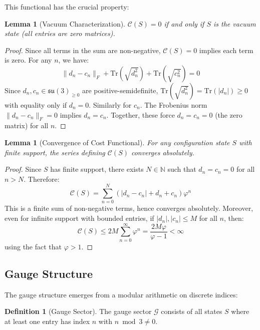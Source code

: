 \documentclass[11pt]{article}
\numberwithin{equation}{section}
\newtheorem{lemma}[theorem]{Lemma}
\theoremstyle{definition}
\newtheorem{definition}[theorem]{Definition}
\theoremstyle{remark}
\begin{document}
This functional has the crucial property:

\begin{lemma}[Vacuum Characterization]
\label{lem:vacuum}
$\mathcal{C}(S) = 0$ if and only if $S$ is the vacuum state (all entries are zero matrices).
\end{lemma}

\begin{proof}
Since all terms in the sum are non-negative, $\mathcal{C}(S) = 0$ implies each term is zero. For any $n$, we have:
\[\|d_n - c_n\|_F + \text{Tr}(\sqrt{d_n^2}) + \text{Tr}(\sqrt{c_n^2}) = 0\]
Since $d_n, c_n \in \mathfrak{su}(3)_{\geq 0}$ are positive-semidefinite, $\text{Tr}(\sqrt{d_n^2}) = \text{Tr}(|d_n|) \geq 0$ with equality only if $d_n = 0$. Similarly for $c_n$. The Frobenius norm $\|d_n - c_n\|_F = 0$ implies $d_n = c_n$. Together, these force $d_n = c_n = 0$ (the zero matrix) for all $n$.
\end{proof}

\begin{lemma}[Convergence of Cost Functional]
For any configuration state $S$ with finite support, the series defining $\mathcal{C}(S)$ converges absolutely.
\end{lemma}

\begin{proof}
Since $S$ has finite support, there exists $N \in \mathbb{N}$ such that $d_n = c_n = 0$ for all $n > N$. Therefore:
\begin{equation}
\mathcal{C}(S) = \sum_{n=0}^{N} \left(|d_n - c_n| + d_n + c_n\right) \varphi^n
\end{equation}
This is a finite sum of non-negative terms, hence converges absolutely. Moreover, even for infinite support with bounded entries, if $|d_n|, |c_n| \leq M$ for all $n$, then:
\begin{equation}
\mathcal{C}(S) \leq 2M \sum_{n=0}^{\infty} \varphi^n = \frac{2M\varphi}{\varphi - 1} < \infty
\end{equation}
using the fact that $\varphi > 1$.
\end{proof}

\subsection{Gauge Structure}

The gauge structure emerges from a modular arithmetic on discrete indices:

\begin{definition}[Gauge Sector]
The gauge sector $\mathcal{G}$ consists of all states $S$ where at least one entry has index $n$ with $n \bmod 3 \neq 0$.
\end{definition}
\end{document}
